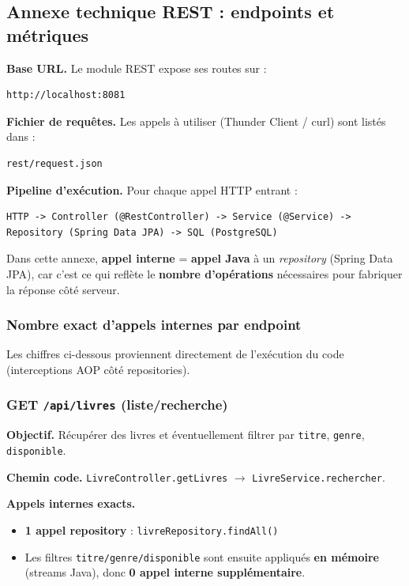 \subsection{Annexe technique REST : endpoints et métriques}
\begin{restbox}[title={REST --- Endpoints, pipeline et métriques}]
\textbf{Base URL.} Le module REST expose ses routes sur :
\begin{lstlisting}
http://localhost:8081
\end{lstlisting}

\textbf{Fichier de requêtes.} Les appels à utiliser (Thunder Client / curl) sont listés dans :
\begin{lstlisting}
rest/request.json
\end{lstlisting}

\textbf{Pipeline d'exécution.} Pour chaque appel HTTP entrant :
\begin{lstlisting}
HTTP -> Controller (@RestController) -> Service (@Service) -> Repository (Spring Data JPA) -> SQL (PostgreSQL)
\end{lstlisting}
\end{restbox}

\begin{warningbox}[title={Définition utilisée dans ce rapport}]
Dans cette annexe, \textbf{appel interne} = \textbf{appel Java} à un \textit{repository} (Spring Data JPA), car c'est ce qui reflète
le \textbf{nombre d'opérations} nécessaires pour fabriquer la réponse côté serveur.
\end{warningbox}

\subsubsection{Nombre exact d'appels internes par endpoint}
Les chiffres ci-dessous proviennent directement de l'exécution du code (interceptions AOP côté repositories).

\subsubsection{GET \texttt{/api/livres} (liste/recherche)}
\textbf{Objectif.} Récupérer des livres et éventuellement filtrer par \texttt{titre}, \texttt{genre}, \texttt{disponible}.

\textbf{Chemin code.} \texttt{LivreController.getLivres} $\rightarrow$ \texttt{LivreService.rechercher}.

\textbf{Appels internes exacts.}
\begin{itemize}[leftmargin=1.5cm]
  \item \textbf{1 appel repository} : \texttt{livreRepository.findAll()}
  \item Les filtres \texttt{titre/genre/disponible} sont ensuite appliqués \textbf{en mémoire} (streams Java), donc \textbf{0 appel interne supplémentaire}.
\end{itemize}

